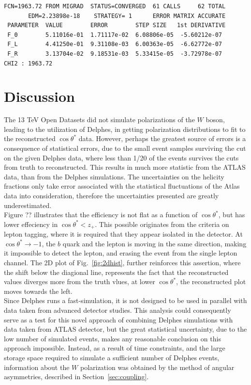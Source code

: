 \documentclass[12pt,a4paper]{article}
\numberwithin{equation}{section}
\begin{document}
\begin{verbatim}
FCN=1963.72 FROM MIGRAD  STATUS=CONVERGED  61 CALLS     62 TOTAL
       EDM=2.23898e-18    STRATEGY= 1      ERROR MATRIX ACCURATE
 PARAMETER  VALUE        ERROR        STEP SIZE   1st DERIVATIVE
 F_0        5.11016e-01  1.71117e-02  6.08806e-05  -5.60212e-07
 F_L        4.41250e-01  9.31108e-03  6.00363e-05  -6.62772e-07
 F_R        3.13704e-02  9.18531e-03  5.33415e-05  -3.72978e-07
CHI2 : 1963.72
\end{verbatim}


\section{Discussion}
The 13 TeV Open Datasets did not simulate polarizations of the $W$ boson,
leading to the utilization of Delphes, in getting polarization distributions to
fit to the reconstructed $\cos \theta^{*}$ data. However, perhaps the greatest source
of errors is a consequence of statistical errors, due to the small event samples
surviving the cut on the given Delphes data, where less than 1/20 of the events
survives the cuts from truth to reconstructed. This results in much more
statistic from the ATLAS data, than from the Delphes simulations. The
uncertainties on the helicity fractions only take error associated with the
statistical fluctuations of the Atlas data into consideration, therefore the
uncertainties presented are greatly underestimated.\\ %

Figure ?? illustrates that the efficiency is not flat as a function of
$\cos \theta^{*}$, but has lower effeciency in $\cos \theta^{*} < z_+$. This possible
originates from the criteria on lepton tagging, where it is required that they
appear isolated in the detector. At $\cos \theta^{*} \rightarrow -1$, the $b$ quark and the
lepton is moving in the same direction, making it impossible to detect the
lepton, and erasing the event from the single lepton channel. The 2D plot of
Fig.~\ref{fig:2dhist}, further reinforces this assertion, where the shift below
the diagional line, represents the fact that the reconstructed values diverges
more from the truth vlues, at lower $\cos \theta^{*}$, the reconstructed plot moves
towards the
left.\\

Since Delphes runs a fast-simulation, it is not designed to be used in parallel
with data taken from advanced detector studies. This analysis could consequently
serve as a test for this novel approach of combining Delphes simulations with
data taken from ATLAS detector, but the great statistical uncertainty, due to
the low number of simulated events, makes any reasonable conclusion on this
approach impossible. Instead, as a result of time constraints, and the large
storage space required to simulate a sufficient number of Delphes events,
information about the $W$ polarization was obtained by the method of angular
asymmetries, described in Section~\ref{sec:coupling}.\\
\end{document}
